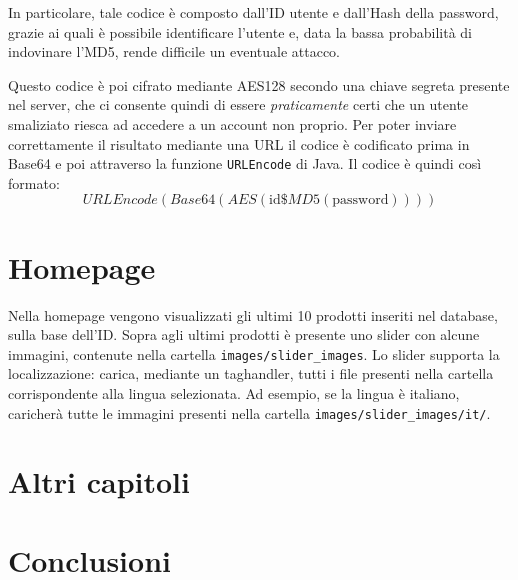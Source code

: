In particolare, tale codice è composto dall'ID utente e dall'Hash della password, grazie ai quali è possibile identificare l'utente e, data la bassa probabilità di indovinare l'MD5, rende difficile un eventuale attacco.

Questo codice è poi cifrato mediante AES128 secondo una chiave segreta presente nel server, che ci consente quindi di essere \textit{praticamente} certi che un utente smaliziato riesca ad accedere a un account non proprio. Per poter inviare correttamente il risultato mediante una URL il codice è codificato prima in Base64 e poi attraverso la funzione \texttt{URLEncode} di Java. Il codice è quindi così formato:
\[
    URLEncode( Base64( AES( \mbox{id}\$MD5(\mbox{password}))))
\]

\chapter{Homepage}
Nella homepage vengono visualizzati gli ultimi 10 prodotti inseriti nel database, sulla base dell'ID. Sopra agli ultimi prodotti è presente uno slider con alcune immagini, contenute nella cartella \texttt{images/slider\_images}. Lo slider supporta la localizzazione: carica, mediante un taghandler, tutti i file presenti nella cartella corrispondente alla lingua selezionata. Ad esempio, se la lingua è italiano, caricherà tutte le immagini presenti nella cartella \texttt{images/slider\_images/it/}.





\chapter{Altri capitoli}
\chapter{Conclusioni}

